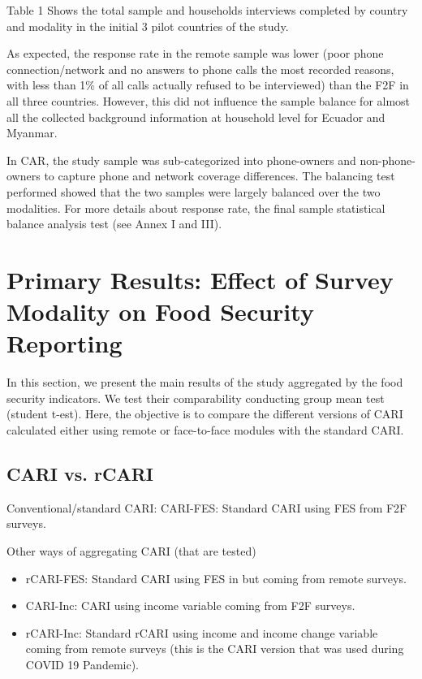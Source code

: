 \documentclass[11pt,harvard]{article}
\begin{document}
Table 1 Shows the total sample and households interviews completed by country and modality in the initial 3 pilot countries of the study.

 
\label{tab:rCARI_Overall_Completion}

As expected, the response rate in the remote sample was lower (poor phone connection/network and no answers to phone calls the most recorded reasons, with less than 1\% of all calls actually refused to be interviewed) than the F2F in all three countries. However, this did not influence the sample balance for almost all the collected background information at household level for Ecuador and Myanmar.
 
In CAR, the study sample was sub-categorized into phone-owners and non-phone-owners to capture phone and network coverage differences. The balancing test performed showed that the two samples were largely balanced over the two modalities. For more details about response rate, the final sample statistical balance analysis test (see Annex I and III).


\pagebreak

\section{Primary Results: Effect of Survey Modality on Food Security Reporting}

In this section, we present the main results of the study aggregated by the food security indicators. We test their comparability conducting group mean test (student t-est). Here, the objective is to compare the different versions of CARI calculated either using remote or face-to-face modules with the standard CARI.

\subsection{CARI vs. rCARI}

Conventional/standard CARI:  CARI-FES: Standard CARI using FES from F2F surveys.

Other ways of aggregating CARI (that are tested)
\begin{itemize}[label=--, left=1.5em]
	\item rCARI-FES: Standard CARI using FES in but coming from remote surveys.
	\item CARI-Inc: CARI using income variable coming from F2F surveys.
	\item rCARI-Inc: Standard rCARI using income and income change variable coming from remote surveys (this is the CARI version that was used during COVID 19 Pandemic).
\end{itemize}
\end{document}
